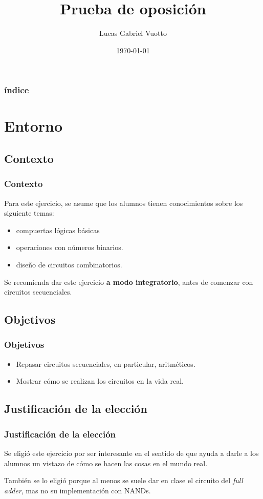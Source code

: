 \documentclass[mathserif,hyperref]{beamer}
\title{Prueba de oposición}
\author{Lucas Gabriel Vuotto}
\date{\today}
\begin{document}
\begin{frame}
\titlepage %
\end{frame}


\begin{frame}
\frametitle{índice}
\tableofcontents
\end{frame}


\section{Entorno}

\subsection{Contexto}
\begin{frame}
\frametitle{Contexto}
Para este ejercicio, se asume que los alumnos tienen conocimientos sobre los
siguiente temas:
\begin{itemize}
  \item compuertas lógicas básicas
  \item operaciones con números binarios.
  \item diseño de circuitos combinatorios.
\end{itemize}

\vspace{0.5cm}
Se recomienda dar este ejercicio \textbf{a modo integratorio}, antes de
comenzar con circuitos secuenciales.
\end{frame}


\subsection{Objetivos}
\begin{frame}
\frametitle{Objetivos}
\begin{itemize}
  \item Repasar circuitos secuenciales, en particular, aritméticos.
  \item Mostrar cómo se realizan los circuitos en la vida real.
\end{itemize}
\end{frame}


\subsection{Justificación de la elección}
\begin{frame}
\frametitle{Justificación de la elección}
Se eligió este ejercicio por ser interesante en el sentido de que ayuda a
darle a los alumnos un vistazo de cómo se hacen las cosas en el mundo real.

\vspace{0.5cm}
También se lo eligió porque al menos se suele dar en clase el circuito del
\textit{full adder}, mas no su implementación con NANDs.
\end{frame}
\end{document}
